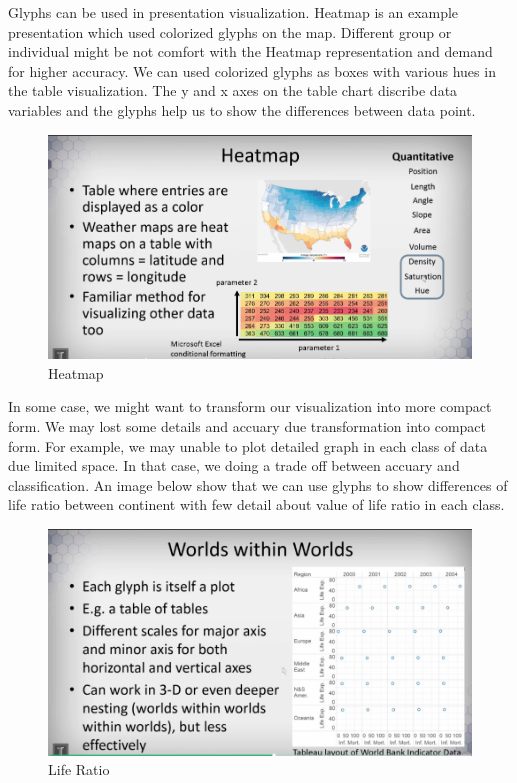 \documentclass[11pt]{article}
\makeatletter
\def\maxwidth{\ifdim\Gin@nat@width>\linewidth\linewidth
    \else\Gin@nat@width\fi}
\let\Oldincludegraphics\includegraphics
\renewcommand{\includegraphics}[1]{\Oldincludegraphics[width=.8\maxwidth]{#1}}
\makeatother
\begin{document}
Glyphs can be used in presentation visualization. Heatmap is an example
presentation which used colorized glyphs on the map. Different group or
individual might be not comfort with the Heatmap representation and
demand for higher accuracy. We can used colorized glyphs as boxes with
various hues in the table visualization. The y and x axes on the table
chart discribe data variables and the glyphs help us to show the
differences between data point.

\begin{figure}
\centering
\includegraphics{images/heatmap.png}
\caption{Heatmap}
\end{figure}

In some case, we might want to transform our visualization into more
compact form. We may lost some details and accuary due transformation
into compact form. For example, we may unable to plot detailed graph in
each class of data due limited space. In that case, we doing a trade off
between accuary and classification. An image below show that we can use
glyphs to show differences of life ratio between continent with few
detail about value of life ratio in each class.

\begin{figure}
\centering
\includegraphics{images/life-ratio.png}
\caption{Life Ratio}
\end{figure}
\end{document}
